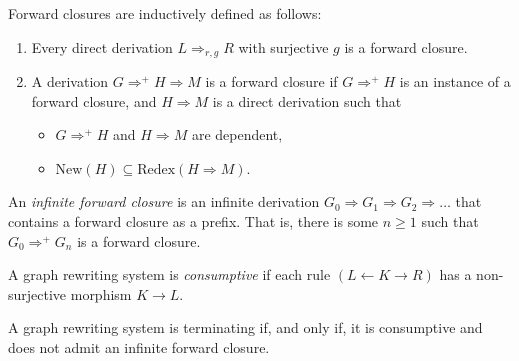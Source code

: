 \begin{definition}
    Forward closures are inductively defined as follows:
    \begin{enumerate}
        \item Every direct derivation $L \Rightarrow_{r,g} R$ with surjective $g$ is a forward closure.
        \item A derivation $G \Rightarrow^+ H \Rightarrow M$ is a forward closure if $G \Rightarrow^+ H$ is an instance of a forward closure, and $H \Rightarrow M$ is a direct derivation such that
        \begin{itemize}
            \item $G \Rightarrow^+ H$ and $H \Rightarrow M$ are dependent,
            \item $\text{New}(H) \subseteq \text{Redex}(H \Rightarrow M)$.
        \end{itemize}
    \end{enumerate}
\end{definition}

\begin{definition}
    An \textit{infinite forward closure} is an infinite derivation $G_0 \Rightarrow G_1 \Rightarrow G_2 \Rightarrow \dots$ that contains a forward closure as a prefix. That is, there is some $n \geq 1$ such that $G_0 \Rightarrow^+ G_n$ is a forward closure.
\end{definition}

\begin{definition}
    A graph rewriting system is \textit{consumptive} if each rule $(L \leftarrow K \rightarrow R)$ has a non-surjective morphism $K \to L$.
\end{definition}
    
\begin{theorem}
    A graph rewriting system is terminating if, and only if, it is consumptive and does not admit an infinite forward closure.
\end{theorem}